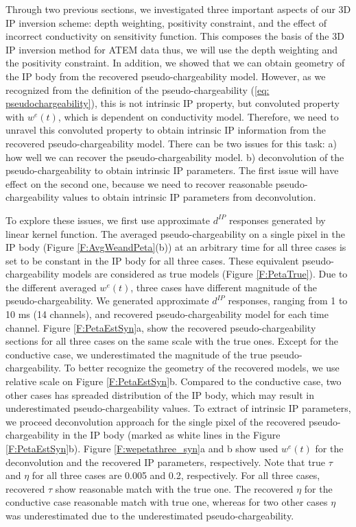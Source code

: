 \documentclass[a4paper, 11pt]{article}
\newcommand{\dip}{d^{IP}}
\begin{document}
Through two previous sections, we investigated three important aspects of our 3D IP inversion scheme: depth weighting, positivity constraint, and the effect of incorrect conductivity on sensitivity function. This composes the basis of the 3D IP inversion method for ATEM data thus, we will use the depth weighting and the positivity constraint. In addition, we showed that we can obtain geometry of the IP body from the recovered pseudo-chargeability model. However, as we recognized from the definition of the pseudo-chargeability (\ref{eq: pseudochargeability}), this is not intrinsic IP property, but convoluted property with $w^e(t)$, which is dependent on conductivity model. Therefore, we need to unravel this convoluted property to obtain intrinsic IP information from the recovered pseudo-chargeability model. There can be two issues for this task: a) how well we can recover the pseudo-chargeability model. b) deconvolution of the pseudo-chargeability to obtain intrinsic IP parameters. The first issue will have effect on the second one, because we need to recover reasonable pseudo-chargeability values to obtain intrinsic IP parameters from deconvolution. 

To explore these issues, we first use approximate $\dip$ responses generated by linear kernel function. The averaged pseudo-chargeability on a single pixel in the IP body (Figure \ref{F:AvgWeandPeta}(b)) at an arbitrary time for all three cases is set to be constant in the IP body for all three cases. These equivalent pseudo-chargeability models are considered as true models (Figure \ref{F:PetaTrue}). Due to the different averaged $w^e(t)$, three cases have different magnitude of the pseudo-chargeability. We generated approximate $\dip$ responses, ranging from 1 to 10 ms (14 channels), and recovered pseudo-chargeability model for each time channel. Figure \ref{F:PetaEstSyn}a, show the recovered pseudo-chargeability sections for all three cases on the same scale with the true ones. Except for the conductive case, we underestimated the magnitude of the true pseudo-chargeability. To better recognize the geometry of the recovered models, we use relative scale on Figure \ref{F:PetaEstSyn}b. Compared to the conductive case, two other cases has spreaded distribution of the IP body, which may result in underestimated pseudo-chargeability values. 
To extract of intrinsic IP parameters, we proceed deconvolution approach for the single pixel of the recovered pseudo-chargeability in the IP body (marked as white lines in the Figure \ref{F:PetaEstSyn}b). Figure \ref{F:wepetathree_syn}a and b show used $w^e(t)$ for the deconvolution and the recovered IP parameters, respectively. Note that true $\tau$ and $\eta$ for all three cases are 0.005 and 0.2, respectively. For all three cases, recovered $\tau$ show reasonable match with the true one. The recovered $\eta$ for the conductive case reasonable match with true one, whereas for two other cases $\eta$ was underestimated due to the underestimated pseudo-chargeability. 
\end{document}
